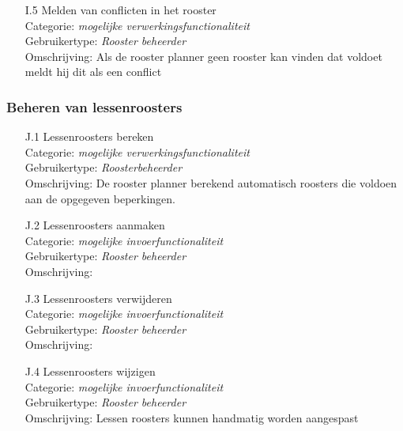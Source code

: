 \documentclass{article}
\begin{document}
\begin{itemize}
\item[I.5] Melden van conflicten in het rooster \\
Categorie: \textit{mogelijke verwerkingsfunctionaliteit} \\
Gebruikertype: \textit{Rooster beheerder} \\
Omschrijving: Als de rooster planner geen rooster kan vinden dat voldoet meldt hij dit als een conflict \\[-3mm]
\end{itemize}

\subsubsection{Beheren van lessenroosters}
\begin{itemize}
\item[J.1] Lessenroosters bereken \\
Categorie: \textit{mogelijke verwerkingsfunctionaliteit} \\
Gebruikertype: \textit{Roosterbeheerder} \\
Omschrijving: De rooster planner berekend automatisch roosters die voldoen aan de opgegeven beperkingen. \\[-3mm]

\item[J.2] Lessenroosters aanmaken \\
Categorie: \textit{mogelijke invoerfunctionaliteit} \\
Gebruikertype: \textit{Rooster beheerder} \\
Omschrijving: \\[-3mm]

\item[J.3] Lessenroosters verwijderen \\
Categorie: \textit{mogelijke invoerfunctionaliteit} \\
Gebruikertype: \textit{Rooster beheerder }\\
Omschrijving: \\[-3mm]

\item[J.4] Lessenroosters wijzigen \\
Categorie: \textit{mogelijke invoerfunctionaliteit} \\
Gebruikertype: \textit{Rooster beheerder} \\
Omschrijving: Lessen roosters kunnen handmatig worden aangespast \\[-3mm]
\end{itemize}
\end{document}
